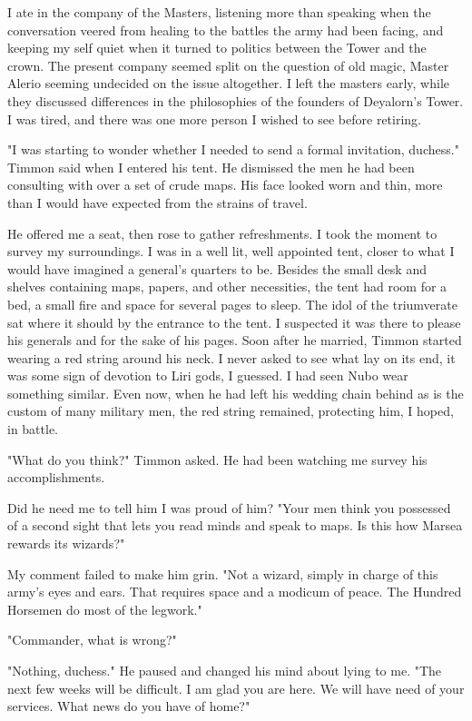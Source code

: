 \documentclass{article}
\begin{document}
I ate in the company of the Masters, listening more than speaking when the conversation veered from healing to the battles the army had been facing, and keeping my self quiet when it turned to politics between the Tower and the crown. The present company seemed split on the question of old magic, Master Alerio seeming undecided on the issue altogether. I left the masters early, while they discussed differences in the philosophies of the founders of Deyalorn's Tower. I was tired, and there was one more person I wished to see before retiring.

"I was starting to wonder whether I needed to send a formal invitation, duchess." Timmon said when I entered his tent. He dismissed the men he had been consulting with over a set of crude maps. His face looked worn and thin, more than I would have expected from the strains of travel.

He offered me a seat, then rose to gather refreshments. I took the moment to survey my surroundings. I was in a well lit, well appointed tent, closer to what I would have imagined a general's quarters to be. Besides the small desk and shelves containing maps, papers, and other necessities, the tent had room for a bed, a small fire and space for several pages to sleep. The idol of the triumverate sat where it should by the entrance to the tent. I suspected it was there to please his generals and for the sake of his pages. Soon after he married, Timmon started wearing a red string around his neck. I never asked to see what lay on its end, it was some sign of devotion to Liri gods, I guessed. I had seen Nubo wear something similar. Even now, when he had left his wedding chain behind as is the custom of many military men, the red string remained, protecting him, I hoped, in battle. 

"What do you think?" Timmon asked. He had been watching me survey his accomplishments. 

Did he need me to tell him I was proud of him? "Your men think you possessed of a second sight that lets you read minds and speak to maps. Is this how Marsea rewards its wizards?"

My comment failed to make him grin. "Not a wizard, simply in charge of this army's eyes and ears. That requires space and a modicum of peace. The Hundred Horsemen do most of the legwork."

"Commander, what is wrong?"

"Nothing, duchess." He paused and changed his mind about lying to me. "The next few weeks will be difficult. I am glad you are here. We will have need of your services. What news do you have of home?"
\end{document}
